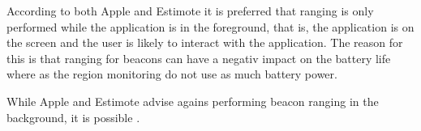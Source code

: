 According to both Apple and Estimote it is preferred that ranging is only performed while the application is in the foreground, that is, the application is on the screen and the user is likely to interact with the application. The reason for this is that ranging for beacons can have a negativ impact on the battery life where as the region monitoring do not use as much battery power.

While Apple and Estimote advise agains performing beacon ranging in the background, it is possible \cite{apple:monitoring-ibeacon} \cite{estimote:monitoring-ranging}.

